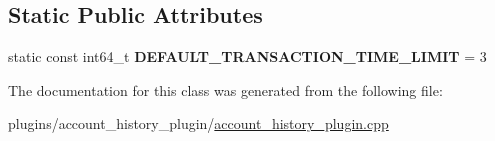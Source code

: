 \subsection*{Static Public Attributes}
\begin{DoxyCompactItemize}
\item 
\mbox{\label{classaacio_1_1account__history__plugin__impl_ae0c13882bb7da5fdb9cbfe63bba55685}} 
static const int64\+\_\+t {\bfseries D\+E\+F\+A\+U\+L\+T\+\_\+\+T\+R\+A\+N\+S\+A\+C\+T\+I\+O\+N\+\_\+\+T\+I\+M\+E\+\_\+\+L\+I\+M\+IT} = 3
\end{DoxyCompactItemize}


The documentation for this class was generated from the following file\+:\begin{DoxyCompactItemize}
\item 
plugins/account\+\_\+history\+\_\+plugin/\mbox{\hyperlink{account__history__plugin_8cpp}{account\+\_\+history\+\_\+plugin.\+cpp}}\end{DoxyCompactItemize}
